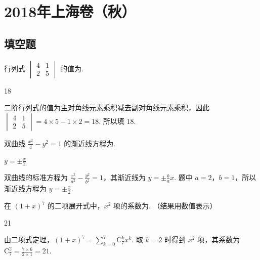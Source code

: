 
\chapter{2018年上海卷（秋）}

\section{填空题}

\begin{problem}
行列式 \(\begin{vmatrix}4 & 1\\2 & 5\end{vmatrix}\) 的值为\fillinblank{}.
\end{problem}

\begin{answer}
18
\end{answer}

\begin{solution}
二阶行列式的值为主对角线元素乘积减去副对角线元素乘积，因此
\(\begin{vmatrix}4 & 1\\2 & 5\end{vmatrix}=4\times5-1\times2=18\). 所以填 \(18\).
\end{solution}

\begin{problem}
双曲线 \(\frac{x^2}{4}-y^2=1\) 的渐近线方程为\fillinblank{}.
\end{problem}

\begin{answer}
\(y=\pm\frac{x}{2}\)
\end{answer}

\begin{solution}
双曲线的标准方程为 \(\frac{x^2}{a^2}-\frac{y^2}{b^2}=1\)，其渐近线为 \(y=\pm\frac{b}{a}x\). 题中 \(a=2\)，\(b=1\)，所以渐近线方程为 \(y=\pm\frac{x}{2}\).
\end{solution}

\begin{problem}
在 \((1+x)^7\) 的二项展开式中，\(x^2\) 项的系数为\fillinblank{}. （结果用数值表示）
\end{problem}

\begin{answer}
21
\end{answer}

\begin{solution}
由二项式定理，\((1+x)^7=\sum_{k=0}^{7}\mathrm C_7^k x^k\). 取 \(k=2\) 时得到 \(x^2\) 项，其系数为 \(\mathrm C_7^2=\frac{7\times6}{2\times1}=21\).
\end{solution}

